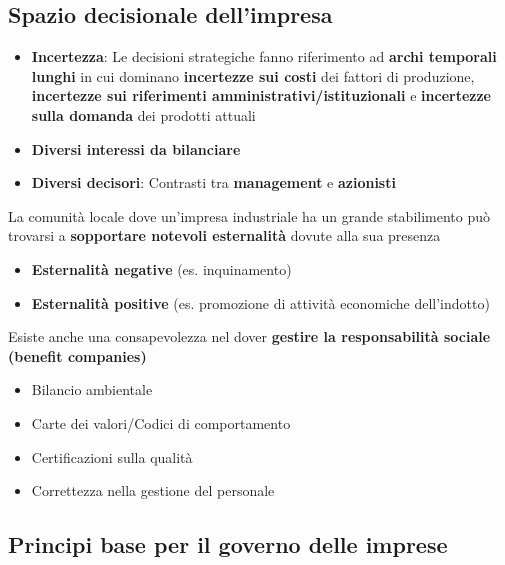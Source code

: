 \documentclass[12pt]{article}
\begin{document}
\subsection{Spazio decisionale dell'impresa}
\begin{itemize}
    \item \textbf{Incertezza}: Le decisioni strategiche fanno riferimento ad \textbf{archi temporali lunghi} in cui dominano \textbf{incertezze sui costi} dei fattori di produzione, \textbf{incertezze sui riferimenti amministrativi/istituzionali} e \textbf{incertezze sulla domanda} dei prodotti attuali
    \item \textbf{Diversi interessi da bilanciare}
    \item \textbf{Diversi decisori}: Contrasti tra \textbf{management} e \textbf{azionisti}
\end{itemize}
La comunità locale dove un'impresa industriale ha un grande stabilimento può trovarsi a \textbf{sopportare notevoli esternalità} dovute alla sua presenza
\begin{itemize}
    \item \textbf{Esternalità negative} (es. inquinamento)
    \item \textbf{Esternalità positive} (es. promozione di attività economiche dell'indotto)
\end{itemize}
Esiste anche una consapevolezza nel dover \textbf{gestire la responsabilità sociale (benefit companies)}
\begin{itemize}
    \item Bilancio ambientale
    \item Carte dei valori/Codici di comportamento
    \item Certificazioni sulla qualità
    \item Correttezza nella gestione del personale
\end{itemize}

\subsection{Principi base per il governo delle imprese}
\end{document}
